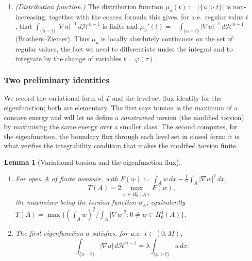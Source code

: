 \documentclass[11pt]{amsart}
\newtheorem{lemma}[theorem]{Lemma}
\theoremstyle{definition}
\newcommand{\abs}[1]{\left|#1\right|}
\newcommand{\dx}{\,dx}
\newcommand{\dH}{\,d\mathcal H^{n-1}}
\begin{document}
\begin{enumerate}[label=\textup{(R\arabic*)}]
\item\label{R:absc} \emph{(Distribution function.)} The distribution
function $\mu_u(t):=\abs{\{u>t\}}$ is non-increasing; together with the
coarea formula this gives, for a.e.\ regular value $t$, that
$\int_{\{u=t\}}\abs{\nabla u}^{-1}\dH$ is finite and
$\mu_u'(t)=-\int_{\{u=t\}}\abs{\nabla u}^{-1}\dH$ (Brothers--Ziemer). Thus
$\mu_u$ is locally absolutely continuous on the set of regular values, the
fact we need to differentiate under the integral and to integrate by the
change of variables $t=\varphi(\tau)$.
\end{enumerate}

\subsubsection*{Two preliminary identities}

We record the variational form of $T$ and the level-set flux identity for
the eigenfunction; both are elementary. The first says torsion is the
maximum of a concave energy and will let us define a \emph{constrained}
torsion (the modified torsion) by maximising the same energy over a smaller
class. The second computes, for the eigenfunction, the boundary flux
through each level set in closed form; it is what verifies the integrability
condition that makes the modified torsion finite.

\begin{lemma}[Variational torsion and the eigenfunction flux]\label{lem:prelim}
\leavevmode
\begin{enumerate}[label=\textup{(\roman*)}]
\item\label{it:Fvar} For open $A$ of finite measure, with
$F(w):=\int_A w\dx-\tfrac12\int_A\abs{\nabla w}^2\dx$,
\begin{equation}\label{eq:Tvar}
  T(A)=2\max_{w\in H^1_0(A)}F(w),
\end{equation}
the maximiser being the torsion function $u_A$; equivalently
$T(A)=\max\{(\int_A w)^2/\int_A\abs{\nabla w}^2:0\ne w\in H^1_0(A)\}$.
\item\label{it:flux} The first eigenfunction $u$ satisfies, for a.e.\
$t\in(0,M)$,
\begin{equation}\label{eq:flux}
  \int_{\{u=t\}}\abs{\nabla u}\dH=\lambda\int_{\{u>t\}}u\dx .
\end{equation}
\end{enumerate}
\end{lemma}
\end{document}
